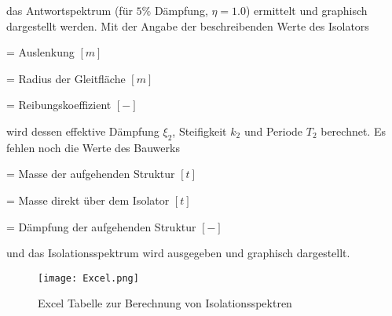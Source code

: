 \pagebreak

das Antwortspektrum (für $5 \%$ Dämpfung, $\eta = 1.0$) ermittelt und graphisch dargestellt werden.
Mit der Angabe der beschreibenden Werte des Isolators

    = Auslenkung $[m]$ \par
{}    = Radius der Gleitfläche $[m]$ \par
\makebox[1cm]{$\mu$}  = Reibungskoeffizient $[-]$ \par

wird dessen effektive Dämpfung $\xi_2$, Steifigkeit $k_2$ und Periode $T_2$ berechnet. Es fehlen noch die Werte des Bauwerks

  = Masse der aufgehenden Struktur $[t]$ \par
{}  = Masse direkt über dem Isolator $[t]$ \par
{} = Dämpfung der aufgehenden Struktur $[-]$ \par

und das Isolationsspektrum wird ausgegeben und graphisch dargestellt.

\begin{figure}[H]
    \centering
    \texttt{[image: Excel.png]}
    \caption{Excel Tabelle zur Berechnung von Isolationsspektren}
    \label{fig:excel}
\end{figure}


\pagebreak